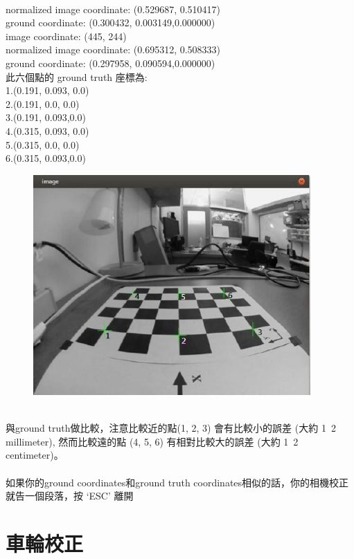 \documentclass{article}
\begin{document}
\\normalized image coordinate: (0.529687, 0.510417)
\\ground coordinate: (0.300432, 0.003149,0.000000)
\\image coordinate: (445, 244)
\\normalized image coordinate: (0.695312, 0.508333)
\\ground coordinate: (0.297958, 0.090594,0.000000)
\\此六個點的 ground truth 座標為:
\\1.(0.191, 0.093, 0.0)
\\2.(0.191, 0.0, 0.0)
\\3.(0.191, 0.093,0.0)
\\4.(0.315, 0.093, 0.0)
\\5.(0.315, 0.0, 0.0)
\\6.(0.315, 0.093,0.0)
\\
\begin{figure}[htp]
    \begin{center}
        \includegraphics[width=300pt]{pic/圖片21.jpg}
    \end{center}
\end{figure}
\\
與ground truth做比較，注意比較近的點(1, 2, 3) 會有比較小的誤差 (大約 1~2 millimeter), 然而比較遠的點 (4, 5, 6) 有相對比較大的誤差 (大約 1~2 centimeter)。
\\
\\如果你的ground coordinates和ground truth coordinates相似的話，你的相機校正就告一個段落，按 ‘ESC’ 離開

\section{車輪校正}
\end{document}

